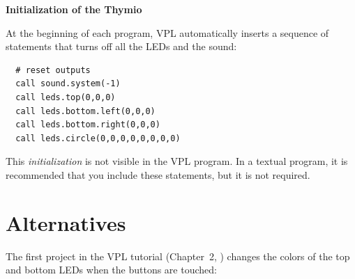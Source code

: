 \documentclass[11pt,a4paper,english]{report}
\begin{document}
\textbf{\large Initialization of the Thymio}

At the beginning of each program, VPL automatically inserts a sequence
of statements that turns off all the LEDs and the sound:
\begin{footnotesize}
\begin{verbatim}
  # reset outputs
  call sound.system(-1)
  call leds.top(0,0,0)
  call leds.bottom.left(0,0,0)
  call leds.bottom.right(0,0,0)
  call leds.circle(0,0,0,0,0,0,0,0)
\end{verbatim}
\end{footnotesize}

This \emph{initialization} is not visible in the VPL program. In a
textual program, it is recommended that you include these statements,
but it is not required.


\chapter{Alternatives}\label{ch.alternatives}

The first project in the VPL tutorial (Chapter~2,
) changes the colors of the top and bottom LEDs
when the buttons are touched:
\end{document}
